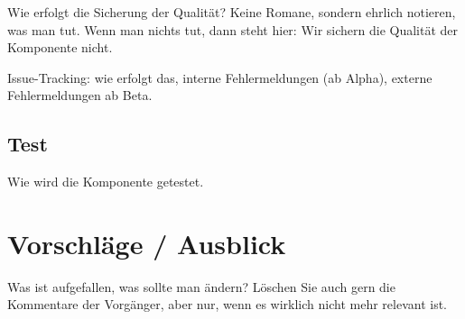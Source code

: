 Wie erfolgt die Sicherung der Qualität? Keine Romane, sondern ehrlich notieren,
was man tut. Wenn man nichts tut, dann steht hier: Wir sichern die Qualität der
Komponente nicht.

Issue-Tracking: wie erfolgt das, interne Fehlermeldungen (ab Alpha), 
externe Fehlermeldungen ab Beta.

\subsection{Test}
Wie wird die Komponente getestet.

\section{Vorschläge / Ausblick}
Was ist aufgefallen, was sollte man ändern? Löschen Sie auch gern die Kommentare
der Vorgänger, aber nur, wenn es wirklich nicht mehr relevant ist.

